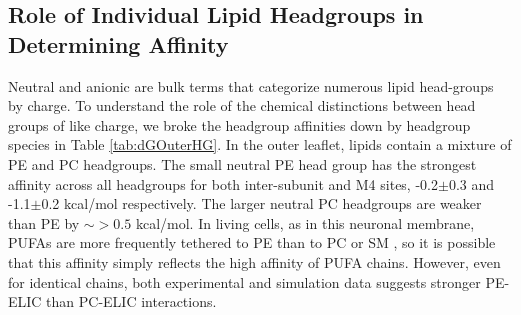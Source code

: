 \subsection{Role of Individual Lipid Headgroups in Determining Affinity}
Neutral and anionic are bulk terms that categorize numerous lipid head-groups by charge. %
To understand the role of the chemical distinctions between head groups of like charge, we broke the headgroup affinities down by headgroup species in Table \ref{tab:dGOuterHG}.  %
In the outer leaflet, lipids contain a mixture of PE and PC headgroups. The small neutral PE head group has the strongest affinity across all headgroups for both inter-subunit and M4 sites, -0.2$\pm$0.3 and -1.1$\pm$0.2 kcal/mol respectively. The larger neutral PC headgroups are weaker than PE by $\sim > 0.5$ kcal/mol. In living cells, as in this neuronal membrane, PUFAs are more frequently tethered to PE than to PC or SM \cite{Isolated1969, Taguchi2010, Breckenridge1973,Ingolfsson2017b,Lorent2020}, so it is possible that this affinity simply reflects the high affinity of PUFA chains. However, even for identical chains, both experimental and simulation data \cite{Sharp2019} suggests stronger PE-ELIC than PC-ELIC interactions.  

